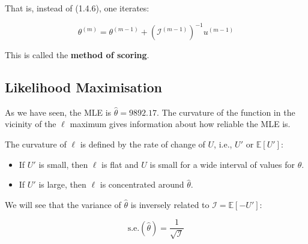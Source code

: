 \documentclass[11pt]{article}
\begin{document}
That is, instead of (1.4.6), one iterates:

\begin{equation}
    \theta^{(m)} = \theta^{(m-1)} + (\mathcal{I}^{(m-1)})^{-1} u^{(m-1)}
\end{equation}

This is called the \textbf{method of scoring}.

\subsection{Likelihood Maximisation}

As we have seen, the MLE is \(\hat{\theta} = 9892.17\). The curvature of the function in the vicinity of the \(\ell\) maximum gives information about how reliable the MLE is.

The curvature of \(\ell\) is defined by the rate of change of \(U\), i.e., \(U'\) or \(\mathbb{E}[U']\):

\begin{itemize}
    \item If \(U'\) is small, then \(\ell\) is flat and \(U\) is small for a wide interval of values for \(\theta\).
    \item If \(U'\) is large, then \(\ell\) is concentrated around \(\hat{\theta}\).
\end{itemize}

We will see that the variance of \(\hat{\theta}\) is inversely related to \(\mathcal{I} = \mathbb{E}[-U']\):

\begin{equation}
    \text{s.e.}(\hat{\theta}) = \frac{1}{\sqrt{\mathcal{I}}}
\end{equation}
\end{document}
